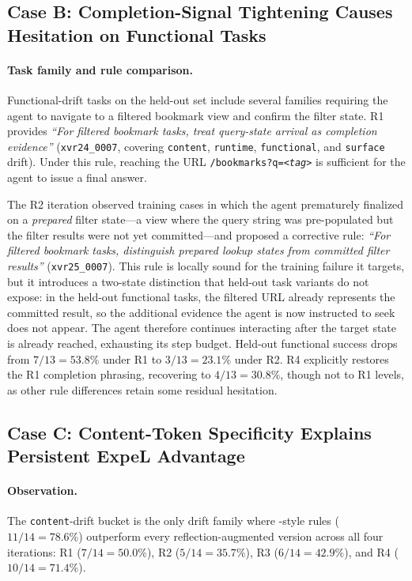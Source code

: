 \subsection{Case B: Completion-Signal Tightening Causes Hesitation on Functional Tasks}

\paragraph{Task family and rule comparison.}
Functional-drift tasks on the held-out set include several families requiring the agent to navigate to a filtered bookmark view and confirm the filter state. R1 provides \emph{``For filtered bookmark tasks, treat query-state arrival as completion evidence''} (\texttt{xvr24\_0007}, covering \texttt{content}, \texttt{runtime}, \texttt{functional}, and \texttt{surface} drift). Under this rule, reaching the URL \texttt{/bookmarks?q=\textrm{\textit{<tag>}}} is sufficient for the agent to issue a final answer.

The R2 iteration observed training cases in which the agent prematurely finalized on a \emph{prepared} filter state---a view where the query string was pre-populated but the filter results were not yet committed---and proposed a corrective rule: \emph{``For filtered bookmark tasks, distinguish prepared lookup states from committed filter results''} (\texttt{xvr25\_0007}). This rule is locally sound for the training failure it targets, but it introduces a two-state distinction that held-out task variants do not expose: in the held-out functional tasks, the filtered URL already represents the committed result, so the additional evidence the agent is now instructed to seek does not appear. The agent therefore continues interacting after the target state is already reached, exhausting its step budget. Held-out functional success drops from \(7/13=53.8\%\) under R1 to \(3/13=23.1\%\) under R2. R4 explicitly restores the R1 completion phrasing, recovering to \(4/13=30.8\%\), though not to R1 levels, as other rule differences retain some residual hesitation.

\subsection{Case C: Content-Token Specificity Explains Persistent ExpeL Advantage}

\paragraph{Observation.}
The \texttt{content}-drift bucket is the only drift family where \expel{}-style rules (\(11/14=78.6\%\)) outperform every reflection-augmented version across all four iterations: R1 (\(7/14=50.0\%\)), R2 (\(5/14=35.7\%\)), R3 (\(6/14=42.9\%\)), and R4 (\(10/14=71.4\%\)).

